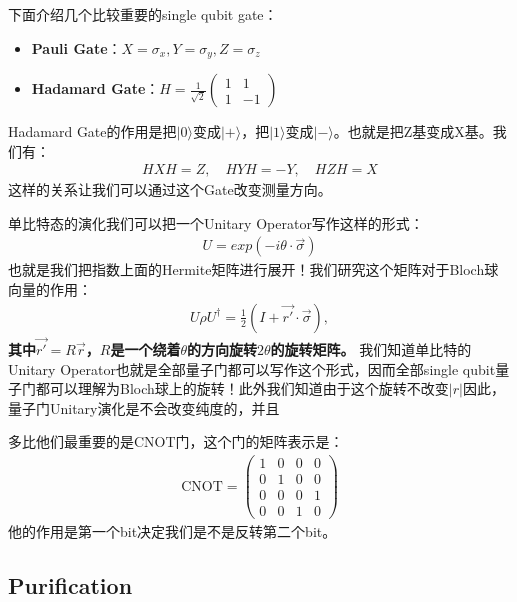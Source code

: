 下面介绍几个比较重要的single qubit gate：
\begin{itemize}
  \item \textbf{Pauli Gate}：$ X=\sigma_x, Y=\sigma_y, Z=\sigma_z $
  \item \textbf{Hadamard Gate}：$ H=\frac{1}{\sqrt{2}}
    \begin{pmatrix}1&1\\1&-1
    \end{pmatrix} $
\end{itemize}
Hadamard Gate的作用是把$ |0\rangle $变成$ |+\rangle $，把$ |1\rangle $变成$
|-\rangle $。也就是把Z基变成X基。我们有：
\begin{align}
  HXH=Z, \quad HYH=-Y, \quad HZH=X
\end{align}
这样的关系让我们可以通过这个Gate改变测量方向。

\bigskip
{}

单比特态的演化我们可以把一个Unitary Operator写作这样的形式：
\begin{align}
  U = exp(-i \theta \cdot \vec{\sigma} )
\end{align}
也就是我们把指数上面的Hermite矩阵进行展开！我们研究这个矩阵对于Bloch球向量的作用：
\begin{align}
  U \rho U^{\dagger} = \frac{1}{2}(I + \vec{r'} \cdot \vec{\sigma}),
\end{align}
\textbf{其中$ \vec{r'} = R \vec{r} $，$ R $是一个绕着$ \theta $的方向旋转$ 2\theta $的旋转矩阵。}
我们知道单比特的Unitary Operator也就是全部量子门都可以写作这个形式，因而全部single
qubit量子门都可以理解为Bloch球上的旋转！此外我们知道由于这个旋转不改变$ |r| $因此，量子门Unitary演化是不会改变纯度的，并且

\bigskip
{}

多比他们最重要的是CNOT门，这个门的矩阵表示是：
\begin{align}
  \mathrm{CNOT} =
  \begin{pmatrix}1&0&0&0\\0&1&0&0\\0&0&0&1\\0&0&1&0
  \end{pmatrix}
\end{align}
他的作用是第一个bit决定我们是不是反转第二个bit。


\subsection{Purification}

